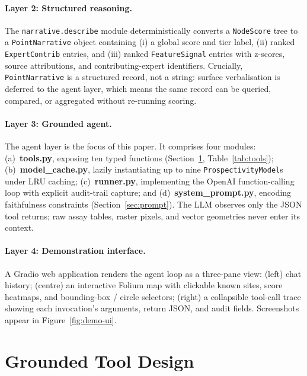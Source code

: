 \documentclass[11pt]{article}
\begin{document}
\paragraph{Layer 2: Structured reasoning.}
The \texttt{narrative.describe} module deterministically converts a
\texttt{NodeScore} tree to a \texttt{PointNarrative} object containing
(i) a global score and tier label, (ii) ranked
\texttt{ExpertContrib} entries, and (iii) ranked \texttt{FeatureSignal}
entries with z-scores, source attributions, and contributing-expert
identifiers. Crucially, \texttt{PointNarrative} is a structured
record, not a string: surface verbalisation is deferred to the agent
layer, which means the same record can be queried, compared, or
aggregated without re-running scoring.

\paragraph{Layer 3: Grounded agent.}
The agent layer is the focus of this paper. It comprises four
modules:
(a)~\textbf{tools.py}, exposing ten typed functions
(Section~\ref{sec:tools}, Table~\ref{tab:tools});
(b)~\textbf{model\_cache.py}, lazily instantiating up to nine
\texttt{ProspectivityModel}s under LRU caching;
(c)~\textbf{runner.py}, implementing the OpenAI function-calling loop
with explicit audit-trail capture;
and (d)~\textbf{system\_prompt.py}, encoding faithfulness constraints
(Section~\ref{sec:prompt}). The LLM observes only the JSON tool
returns; raw assay tables, raster pixels, and vector geometries never
enter its context.

\paragraph{Layer 4: Demonstration interface.}
A Gradio web application renders the agent loop as a three-pane view:
(left) chat history; (centre) an interactive Folium map with
clickable known sites, score heatmaps, and bounding-box / circle
selectors; (right) a collapsible tool-call trace showing each
invocation's arguments, return JSON, and audit fields. Screenshots
appear in Figure~\ref{fig:demo-ui}.

\section{Grounded Tool Design}
\label{sec:tools}
\end{document}
